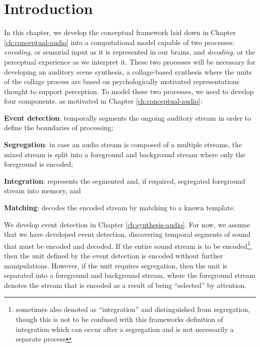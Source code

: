 \documentclass[a4paper,10pt,final]{ThesisStyle}
\begin{document}
\section{Introduction}

In this chapter, we develop the conceptual framework laid down in Chapter \ref{ch:conceptual-audio} into a computational model capable of two processes: \textit{encoding}, or sensorial input as it is represented in our brains, and \textit{decoding}, or the perceptual experience as we interpret it.   These two processes will be necessary for developing an auditory scene synthesis, a collage-based synthesis where the units of the collage process are based on psychologically motivated representations thought to support perception.  To model these two processes, we need to develop four components, as motivated in Chapter \ref{ch:conceptual-audio}: 

\begin{enumerateb}
\item \textbf{Event detection}: temporally segments the ongoing auditory stream in order to define the boundaries of processing; 
\item \textbf{Segregation}: in case an audio stream is composed of a multiple streams, the mixed stream is split into a foreground and background stream where only the foreground is encoded; 
\item \textbf{Integration}: represents the segmented and, if required, segregated foreground stream into memory, and 
\item \textbf{Matching}: decodes the encoded stream by matching to a known template.
\end{enumerateb}

We develop event detection in Chapter \ref{ch:synthesis-audio}.  For now, we assume that we have developed event detection, discovering temporal segments of sound that must be encoded and decoded.  If the entire sound stream is to be encoded\footnote{sometimes also denoted as ``integration'' and distinguished from segregation, though this is not to be confused with this frameworks definition of integration which can occur after a segregation and is not necessarily a separate process}, then the unit defined by the event detection is encoded without further manipulations. However, if the unit requires segregation, then the unit is separated into a foreground and background stream, where the foreground stream denotes the stream that is encoded as a result of being ``selected'' by attention.  
\end{document}
